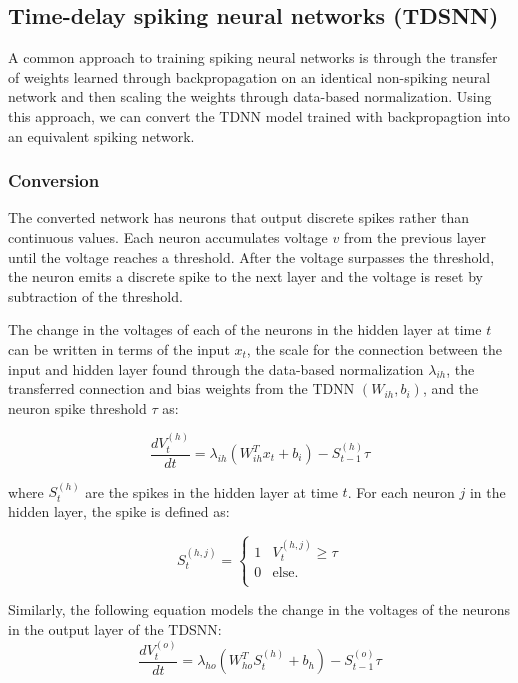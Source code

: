 \documentclass{article}
\begin{document}
\subsection*{Time-delay spiking neural networks (TDSNN)}

A common approach to training spiking neural networks is through the transfer of weights learned through backpropagation on an identical non-spiking neural network and then scaling the weights through data-based normalization. Using this approach, we can convert the TDNN model trained with backpropagtion into an equivalent spiking network. \cite{rueckauer2017conversion}

\subsubsection*{Conversion}
The converted network has neurons that output discrete spikes rather than continuous values. Each neuron accumulates voltage $v$ from the previous layer until the voltage reaches a threshold. After the voltage surpasses the threshold, the neuron emits a discrete spike to the next layer and the voltage is reset by subtraction of the threshold. \cite{diehl2015fast} 

The change in the voltages of each of the neurons in the hidden layer at time $t$ can be written in terms of the input $x_t$, the scale for the connection between the input and hidden layer found through the data-based normalization $\lambda_{ih}$, the transferred connection and bias weights from the TDNN $\left(W_{ih}, b_{i}\right)$, and the neuron spike threshold $\tau$ as:

\begin{equation}
    \frac{dV^{\left(h\right)}_t}{dt} = \lambda_{ih}\left(W_{ih}^Tx_t + b_i\right) - S^{\left(h\right)}_{t-1}\tau
\end{equation}

where $S^{\left(h\right)}_{t}$ are the spikes in the hidden layer at time $t$. For each neuron $j$ in the hidden layer, the spike is defined as:

\begin{equation}
    S^{\left(h,j\right)}_{t} = \begin{cases} 1 & V^{\left(h,j\right)}_{t}\geq \tau \\
      0 & \text{else.} \\ \end{cases}
\end{equation}

Similarly, the following equation models the change in the voltages of the neurons in the output layer of the TDSNN:
\begin{equation}
    \frac{dV^{\left(o\right)}_t}{dt} = \lambda_{ho} \left(W_{ho}^TS^{\left(h\right)}_{t} + b_h\right) - S^{\left(o\right)}_{t-1} \tau
\end{equation}
\end{document}
